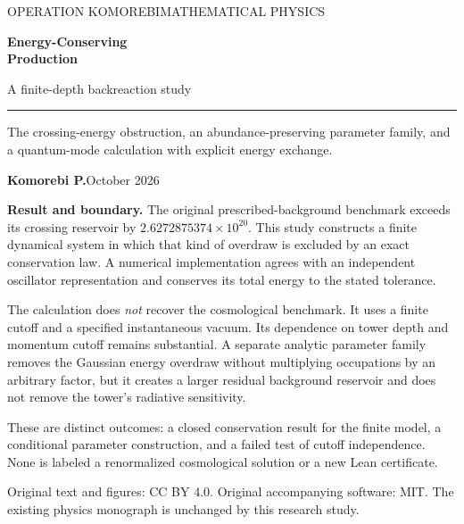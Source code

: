 \documentclass[11pt]{article}
\theoremstyle{definition}\newtheorem{definition}[theorem]{Definition}
\begin{document}
\thispagestyle{empty}
{\noindent\sffamily\small\color{PhysicsTeal}OPERATION KOMOREBI\hfill MATHEMATICAL PHYSICS\par}
\vspace{.55in}
{\noindent\fontsize{31}{36}\selectfont\bfseries\color{PhysicsNavy}Energy-Conserving\\Production\par}
\vspace{.20in}
{\noindent\Large A finite-depth backreaction study\par}
\vspace{.19in}
{\noindent\color{PhysicsCopper}\rule{1.25in}{1pt}\par}
\vspace{.16in}
\noindent The crossing-energy obstruction, an abundance-preserving parameter family, and a quantum-mode calculation with explicit energy exchange.\par
\vspace{.28in}
\noindent\textbf{Komorebi P.}\hfill October 2026\par
\vspace{.35in}
\noindent\textbf{Result and boundary.} The original prescribed-background benchmark exceeds its crossing reservoir by $2.6272875374\times10^{20}$. This study constructs a finite dynamical system in which that kind of overdraw is excluded by an exact conservation law. A numerical implementation agrees with an independent oscillator representation and conserves its total energy to the stated tolerance.

The calculation does \emph{not} recover the cosmological benchmark. It uses a finite cutoff and a specified instantaneous vacuum. Its dependence on tower depth and momentum cutoff remains substantial. A separate analytic parameter family removes the Gaussian energy overdraw without multiplying occupations by an arbitrary factor, but it creates a larger residual background reservoir and does not remove the tower's radiative sensitivity.

These are distinct outcomes: a closed conservation result for the finite model, a conditional parameter construction, and a failed test of cutoff independence. None is labeled a renormalized cosmological solution or a new Lean certificate.
\vfill
{\noindent\footnotesize Original text and figures: CC BY 4.0. Original accompanying software: MIT. The existing physics monograph is unchanged by this research study.\par}
\clearpage
\end{document}
